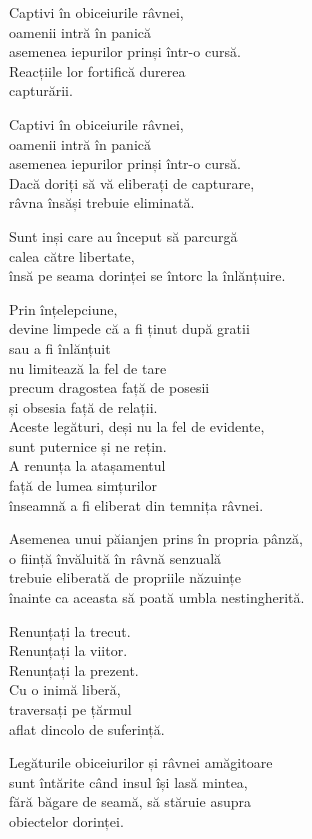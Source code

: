 Captivi în obiceiurile râvnei,\\
oamenii intră în panică\\
asemenea iepurilor prinși într-o cursă.\\
Reacțiile lor fortifică durerea\\
capturării.


Captivi în obiceiurile râvnei,\\
oamenii intră în panică\\
asemenea iepurilor prinși într-o cursă.\\
Dacă doriți să vă eliberați de capturare,\\
râvna însăși trebuie eliminată.


Sunt inși care au început să parcurgă\\
calea către libertate,\\
însă pe seama dorinței se întorc la înlănțuire.


Prin înțelepciune,\\
devine limpede că a fi ținut după gratii\\
sau a fi înlănțuit\\
nu limitează la fel de tare\\
precum dragostea față de posesii\\
și obsesia față de relații.\\
Aceste legături, deși nu la fel de evidente,\\
sunt puternice și ne rețin.\\
A renunța la atașamentul\\
față de lumea simțurilor\\
înseamnă a fi eliberat din temnița râvnei.


Asemenea unui păianjen prins în propria pânză,\\
o ființă învăluită în râvnă senzuală\\
trebuie eliberată de propriile năzuințe\\
înainte ca aceasta să poată umbla nestingherită.


Renunțați la trecut.\\
Renunțați la viitor.\\
Renunțați la prezent.\\
Cu o inimă liberă,\\
traversați pe țărmul\\
aflat dincolo de suferință.


Legăturile obiceiurilor și râvnei amăgitoare\\
sunt întărite când insul își lasă mintea,\\
fără băgare de seamă, să stăruie asupra\\
obiectelor dorinței.


